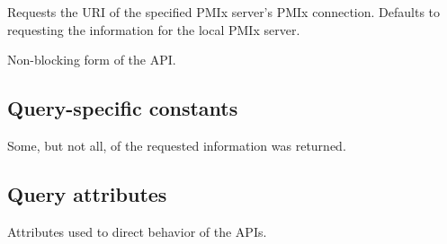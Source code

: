  Requests the URI of the specified \ac{PMIx} server's \ac{PMIx} connection. Defaults to requesting the information for the local \ac{PMIx} server.
\pasteAttributeItemEnd
{}

\optattrend

\descr

Non-blocking form of the  \ac{API}.


\subsection{Query-specific constants}
\label{api:struct:constants:query}

\begin{constantdesc}
%
Some, but not all, of the requested information was returned.
%
\end{constantdesc}


\subsection{Query attributes}
\label{api:struct:attributes:query}

Attributes used to direct behavior of the  \acp{API}.

